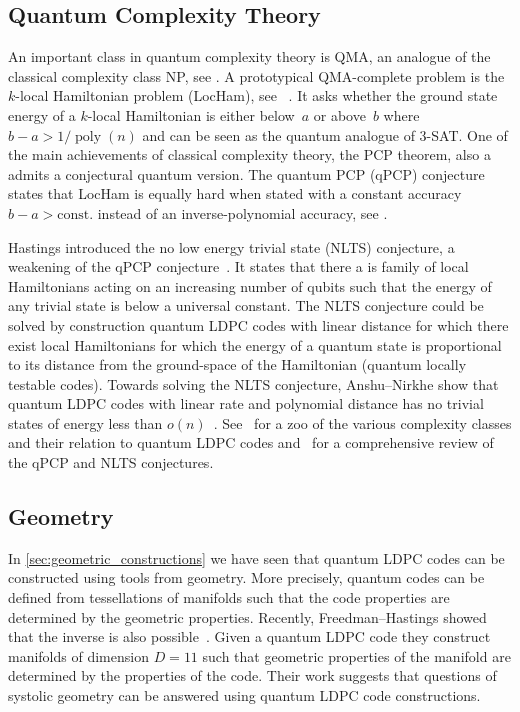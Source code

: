 \documentclass[amsmath, amssymb, floatfix, reprint, twocolumn, notitlepage, 10pt]{revtex4-1}
\newcommand{\change}{}
\newcommand{\poly}{\operatorname{poly}}
\begin{document}
\subsection{Quantum Complexity Theory}
An important class in quantum complexity theory is QMA, an analogue of the classical complexity class NP, see \cite{kitaev2002classical,aharonov2002quantum}.
A prototypical QMA-complete problem is the $k$-local Hamiltonian problem (LocHam), see ~\cite{kitaev2002classical}.
It asks whether the ground state energy of a $k$-local Hamiltonian is either below~$a$ or above~$b$ where $b-a > 1/\poly(n)$ and can be seen as the quantum analogue of $3$-SAT.
One of the main achievements of classical complexity theory, the PCP theorem, also a admits a conjectural quantum version. The quantum PCP (qPCP) conjecture states that LocHam is equally hard when stated with a constant accuracy $b-a> \text{const.}$ instead of an inverse-polynomial accuracy, see \cite{arora1998probabilistic,dinur2007pcp}.

Hastings introduced the no low energy trivial state (NLTS) conjecture, a weakening of the qPCP conjecture~\cite{hastings2012trivial,freedman2013quantum}. 
It states that there a is family of local Hamiltonians acting on an increasing number of qubits such that the energy of any trivial state is below a universal constant.
The NLTS conjecture could be solved by construction quantum LDPC codes with linear distance for which there exist local Hamiltonians for which the energy of a quantum state is proportional to its distance from the ground-space of the Hamiltonian (quantum locally testable codes).
{\change
Towards solving the NLTS conjecture, Anshu--Nirkhe show that quantum LDPC codes with linear rate and polynomial distance has no trivial states of energy less than $o(n)$~\cite{anshu2020circuit}.
}
See~\cite{eldar_local_2017} for a zoo of the various complexity classes and their relation to quantum LDPC codes and~\cite{aharonov2013guest} for a comprehensive review of the qPCP and NLTS conjectures.


\subsection{Geometry}
%
In \cref{sec:geometric_constructions} we have seen that quantum LDPC codes can be constructed using tools from geometry.
More precisely, quantum codes can be defined from tessellations of manifolds such that the code properties are determined by the geometric properties.
Recently, Freedman--Hastings showed that the inverse is also possible~\cite{freedman2020building}.
Given a quantum LDPC code they construct manifolds of dimension $D=11$ such that geometric properties of the manifold are determined by the properties of the code.
Their work suggests that questions of systolic geometry can be answered using quantum LDPC code constructions.
\end{document}
